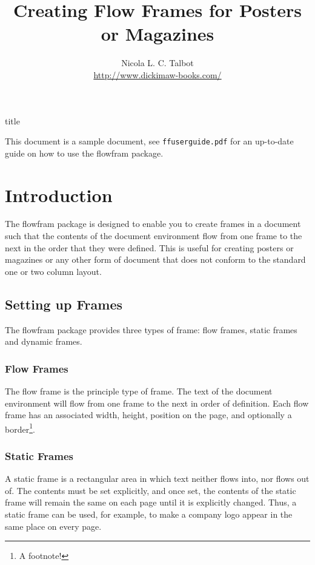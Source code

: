 \documentclass[a4paper]{article}\usepackage[]{graphicx}\usepackage[]{color}
\newcommand{\sty}[1]{\textsf{#1}}
\newcommand{\env}[1]{\textsf{#1}}
\begin{document}
\begin{staticcontents*}{title}
\title{Creating Flow Frames for Posters or Magazines}
\author{Nicola L. C. Talbot\\[1cm]\url{http://www.dickimaw-books.com/}}
\date{}
\maketitle
\end{staticcontents*}

This document is a sample document, see \linebreak
\texttt{ffuserguide.pdf} for
an up-to-date guide on how to use the \sty{flowfram} package.

\section{Introduction}

The \sty{flowfram} package is designed to enable you to create
frames in a document such that the
contents of the \env{document} environment flow from one
frame to the next in the order that they were defined.
This is useful for creating posters
or magazines or any other form of document that does not
conform to the standard one or two column layout.

\subsection{Setting up Frames}

The \sty{flowfram} package provides three types of frame:
{flow frames}, {static
frames} and {dynamic frames}.

\subsubsection{Flow Frames}

The flow frame is the principle type of frame.
The text of the \env{document} environment will flow from
one frame to the next in order of definition. Each
flow frame has an associated width, height,
position on the page, and optionally a border\footnote{A
footnote!}.

\subsubsection{Static Frames}

A static frame is a rectangular area in which text neither
flows into, nor flows out of.  The contents must be set
explicitly, and once set, the contents of the static frame will
remain the same on each page until it is explicitly
changed.  Thus, a static frame can be used, for example, to make
a company logo appear in the same place on every page.
\end{document}
